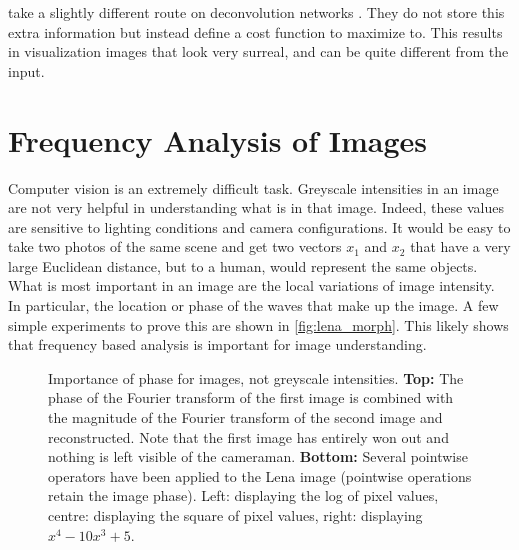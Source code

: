   \citeauthor{mahendran_understanding_2015} take a slightly different route on
  deconvolution networks \citep{mahendran_understanding_2015}. They do not
  store this extra information but instead define a cost function to maximize
  to. This results in visualization images that look very surreal, and can be
  quite different from the input.



\chapter{Frequency Analysis of Images}\label{ch:freq_analysis}
  Computer vision is an extremely difficult task. Greyscale intensities in an image are
  not very helpful in understanding what is in that image. Indeed, these values are
  sensitive to lighting conditions and camera configurations. It would be easy to
  take two photos of the same scene and get two vectors $x_1$ and $x_2$ that have
  a very large Euclidean distance, but to a human, would represent the same
  objects. What is most important in an image are the local variations
  of image intensity. In particular, the location or phase of the waves that make
  up the image. A few simple experiments to prove this are shown in
  \autoref{fig:lena_morph}. This likely shows that frequency based analysis is 
  important for image understanding. 

  \begin{figure}
    \centering
      \subfloat{\makebox[\textwidth][c]{%
      }}
      \newline
      \subfloat{\makebox[\textwidth][c]{%
      }}
      \caption[Importance of phase for images, not greyscale intensities]
              {Importance of phase for images, not greyscale intensities.
              \textbf{Top:} 
              The phase of the Fourier transform 
              of the first image is combined with the magnitude of the Fourier
              transform of the second image and reconstructed. Note that the
              first image has entirely won out and nothing is left visible of
              the cameraman. \textbf{Bottom:} Several pointwise operators have been
              applied to the Lena image (pointwise operations retain the image
              phase). Left: displaying the log of pixel
              values, centre: displaying the square of pixel values, right:
              displaying $x^4-10x^3+5$.}
      \label{fig:lena_morph}
  \end{figure}

